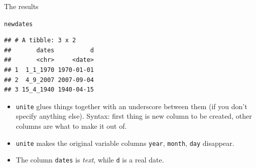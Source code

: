 \documentclass[unknownkeysallowed]{beamer}\usepackage[]{graphicx}\usepackage[]{color}
\makeatletter
\newcommand{\hlstd}[1]{\textcolor[rgb]{0.345,0.345,0.345}{#1}}%
\newenvironment{kframe}{%
 \def\at@end@of@kframe{}%
 \ifinner\ifhmode%
  \def\at@end@of@kframe{\end{minipage}}%
  \begin{minipage}{\columnwidth}%
 \fi\fi%
 \def\FrameCommand##1{\hskip\@totalleftmargin \hskip-\fboxsep
 \colorbox{shadecolor}{##1}\hskip-\fboxsep
     \hskip-\linewidth \hskip-\@totalleftmargin \hskip\columnwidth}%
 \MakeFramed {\advance\hsize-\width
   \@totalleftmargin\z@ \linewidth\hsize
   \@setminipage}}%
 {\par\unskip\endMakeFramed%
 \at@end@of@kframe}
\newenvironment{knitrout}{}{} %
\makeatother
\begin{document}
\begin{frame}[fragile]{The results}
  
\begin{knitrout}
\color{fgcolor}\begin{kframe}
\begin{alltt}
\hlstd{newdates}
\end{alltt}
\begin{verbatim}
## # A tibble: 3 x 2
##       dates          d
##       <chr>     <date>
## 1  1_1_1970 1970-01-01
## 2  4_9_2007 2007-09-04
## 3 15_4_1940 1940-04-15
\end{verbatim}
\end{kframe}
\end{knitrout}

\begin{itemize}
\item \texttt{unite} glues things together with an underscore between
  them (if you don't specify anything else). Syntax: first thing is
  new column to be created, other columns are what to make it out of.
\item \texttt{unite} makes the original variable columns
  \texttt{year}, \texttt{month}, \texttt{day} disappear.
\item The column \texttt{dates} is \emph{text}, while \texttt{d} is a
  real date.
\end{itemize}
  
\end{frame}
\end{document}
